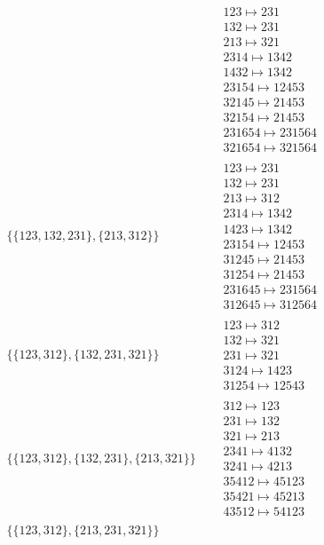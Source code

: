 \begin{tiny}
\begin{align}
\quad
&
\begin{matrix}
123 \mapsto 231\\132 \mapsto 231\\213 \mapsto 321\\2314 \mapsto 1342\\1432 \mapsto 1342\\23154 \mapsto 12453\\32145 \mapsto 21453\\32154 \mapsto 21453\\231654 \mapsto 231564\\321654 \mapsto 321564
\end{matrix}
\\
\{\{123, 132, 231\}, \{213, 312\}\}
\quad
&
\begin{matrix}
123 \mapsto 231\\132 \mapsto 231\\213 \mapsto 312\\2314 \mapsto 1342\\1423 \mapsto 1342\\23154 \mapsto 12453\\31245 \mapsto 21453\\31254 \mapsto 21453\\231645 \mapsto 231564\\312645 \mapsto 312564
\end{matrix}
\\
\{\{123, 312\}, \{132, 231, 321\}\}
\quad
&
\begin{matrix}
123 \mapsto 312\\132 \mapsto 321\\231 \mapsto 321\\3124 \mapsto 1423\\31254 \mapsto 12543
\end{matrix}
\\
\{\{123, 312\}, \{132, 231\}, \{213, 321\}\}
\quad
&
\begin{matrix}
312 \mapsto 123\\231 \mapsto 132\\321 \mapsto 213\\2341 \mapsto 4132\\3241 \mapsto 4213\\35412 \mapsto 45123\\35421 \mapsto 45213\\43512 \mapsto 54123
\end{matrix}
\\
\{\{123, 312\}, \{213, 231, 321\}\}
\quad
&
\begin{matrix}

\end{matrix}
\end{align}
\end{tiny}
